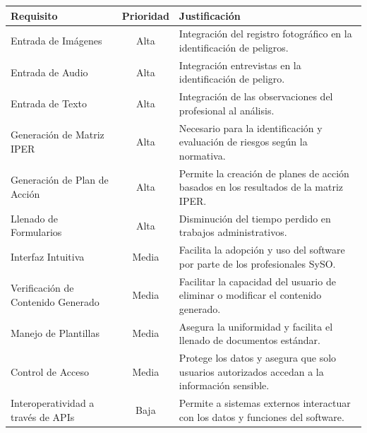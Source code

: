 \begin{tabularx}{\textwidth}{|l|c|X|}
\hline
\textbf{Requisito} & \textbf{Prioridad} & \textbf{Justificación} \\ \hline
Entrada de Imágenes & Alta & Integración del registro fotográfico en la identificación de peligros. \\
\hline
Entrada de Audio & Alta & Integración entrevistas  en la identificación de peligro. \\
\hline
Entrada de Texto & Alta & Integración de las observaciones del profesional al análisis. \\
\hline
Generación de Matriz IPER & Alta & Necesario para la identificación y evaluación de riesgos según la normativa. \\
\hline
Generación de Plan de Acción & Alta & Permite la creación de planes de acción basados en los resultados de la matriz IPER. \\
\hline
Llenado de Formularios & Alta & Disminución del tiempo perdido en trabajos administrativos. \\
\hline
Interfaz Intuitiva & Media & Facilita la adopción y uso del software por parte de los profesionales SySO. \\
\hline
Verificación de Contenido Generado & Media & Facilitar la capacidad del usuario de eliminar o modificar el contenido generado. \\
\hline
Manejo de Plantillas & Media & Asegura la uniformidad y facilita el llenado de documentos estándar. \\
\hline
Control de Acceso & Media & Protege los datos y asegura que solo usuarios autorizados accedan a la información sensible. \\
\hline
Interoperatividad a través de APIs & Baja & Permite a sistemas externos interactuar con los datos y funciones del software. \\
\hline
\end{tabularx}
